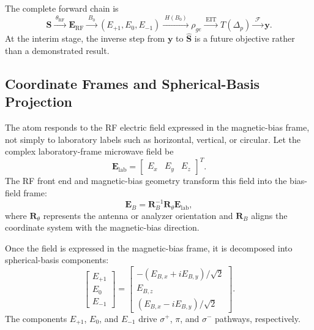\documentclass{ieeeaccess}
\begin{document}
The complete forward chain is
\begin{equation}
\mathbf{S}
\xrightarrow{\;\theta_{\mathrm{RF}}\;}
\mathbf{E}_{\mathrm{RF}}
\xrightarrow{\;B_0\;}
(E_{+1},E_0,E_{-1})
\xrightarrow{\;H(B_0)\;}
\rho_{ge}
\xrightarrow{\;\mathrm{EIT}\;}
T(\Delta_p)
\xrightarrow{\;\mathcal{F}\;}
\mathbf{y}.
\label{eq:annex_forward_chain}
\end{equation}
At the interim stage, the inverse step from \(\mathbf{y}\) to \(\widehat{\mathbf{S}}\) is a future objective rather than a demonstrated result.

\subsection{Coordinate Frames and Spherical-Basis Projection}
\label{annex:coordinate_projection}

The atom responds to the RF electric field expressed in the magnetic-bias frame, not simply to laboratory labels such as horizontal, vertical, or circular. Let the complex laboratory-frame microwave field be
\begin{equation}
\mathbf{E}_{\mathrm{lab}}
=
\begin{bmatrix}
E_x & E_y & E_z
\end{bmatrix}^{T}.
\label{eq:annex_lab_field}
\end{equation}
The RF front end and magnetic-bias geometry transform this field into the bias-field frame:
\begin{equation}
\mathbf{E}_{B}
=
\mathbf{R}_{B}^{-1}
\mathbf{R}_{\theta}
\mathbf{E}_{\mathrm{lab}},
\label{eq:annex_bias_frame}
\end{equation}
where \(\mathbf{R}_{\theta}\) represents the antenna or analyzer orientation and \(\mathbf{R}_{B}\) aligns the coordinate system with the magnetic-bias direction.

Once the field is expressed in the magnetic-bias frame, it is decomposed into spherical-basis components:
\begin{equation}
\begin{bmatrix}
E_{+1}\\
E_{0}\\
E_{-1}
\end{bmatrix}
=
\begin{bmatrix}
-\left(E_{B,x}+iE_{B,y}\right)/\sqrt{2}\\
E_{B,z}\\
\left(E_{B,x}-iE_{B,y}\right)/\sqrt{2}
\end{bmatrix}.
\label{eq:annex_spherical_components_detailed}
\end{equation}
The components \(E_{+1}\), \(E_0\), and \(E_{-1}\) drive \(\sigma^+\), \(\pi\), and \(\sigma^-\) pathways, respectively.
\end{document}
